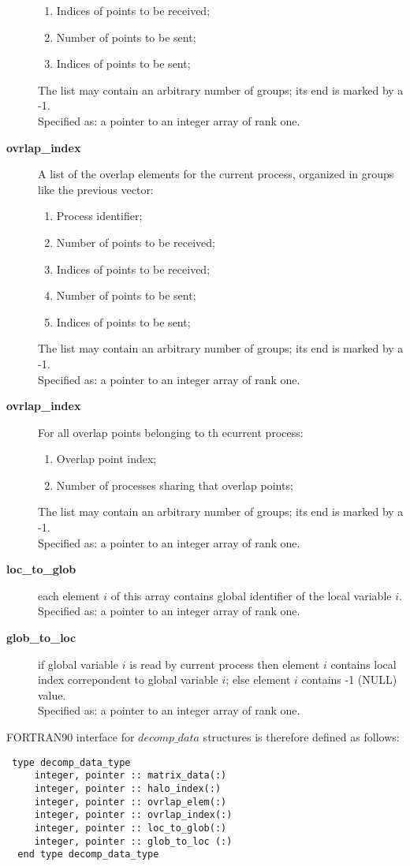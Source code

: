 \begin{description}
\begin{enumerate}
\item Indices of points to be received;
\item Number of points to be sent;
\item Indices of points to be sent;
\end{enumerate}
The list may contain an arbitrary number of groups; its end is marked
by a -1.\\
Specified as: a pointer to an integer array of rank one.
\item [{\bf ovrlap\_index}] A list of the overlap elements for the
current process, organized in groups like the previous vector:
\begin{enumerate}
\item Process identifier;
\item Number of points to be received;
\item Indices of points to be received;
\item Number of points to be sent;
\item Indices of points to be sent;
\end{enumerate}
The list may contain an arbitrary number of groups; its end is marked
by a -1.\\
Specified as: a pointer to an integer array  of rank one.
\item [{\bf ovrlap\_index}] For all overlap points belonging to th
ecurrent process:
\begin{enumerate}
\item  Overlap point index;
\item  Number of processes sharing that overlap points;
\end{enumerate}
The list may contain an arbitrary number of groups; its end is marked
by a -1.\\
Specified as: a pointer to an integer array of rank one.
\item[{\bf loc\_to\_glob}] each element $i$ of this array contains
global identifier of the local variable $i$.\\
Specified as: a pointer to an integer array of rank one.
\item[{\bf glob\_to\_loc}]  if global variable $i$ is read by current
process then element $i$ contains local index correpondent to global variable $i$;
else element $i$ contains -1 (NULL) value.\\
Specified as: a pointer to an integer array of rank one.
\end{description}
FORTRAN90 interface for $decomp\_data$ structures is therefore defined
as follows:
\begin{verbatim}
 type decomp_data_type
     integer, pointer :: matrix_data(:)
     integer, pointer :: halo_index(:)
     integer, pointer :: ovrlap_elem(:)
     integer, pointer :: ovrlap_index(:)
     integer, pointer :: loc_to_glob(:)
     integer, pointer :: glob_to_loc (:)
  end type decomp_data_type
\end{verbatim}

